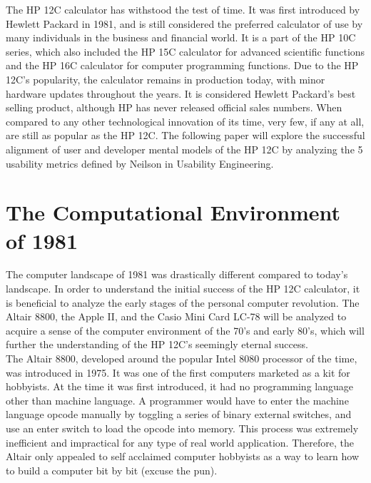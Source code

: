 \documentclass{article}
\begin{document}
The HP 12C calculator has withstood the test of time.  It was first introduced by Hewlett Packard in 1981, and is still considered the preferred calculator of use by many individuals in the business and financial world.   It is a part of the HP 10C series, which also included the HP 15C calculator for advanced scientific functions and the HP 16C calculator for computer programming functions.  Due to the HP 12C’s popularity, the calculator remains in production today, with minor hardware updates throughout the years.  It is considered Hewlett Packard’s best selling product, although HP has never released official sales numbers.  When compared to any other technological innovation of its time, very few, if any at all, are still as popular as the HP 12C.  The following paper will explore the successful alignment of user and developer mental models of the HP 12C by analyzing the 5 usability metrics defined by Neilson in Usability Engineering.

\section{The Computational Environment of 1981}
\label{The Computational Environment of 1981}

The computer landscape of 1981 was drastically different compared to today’s landscape.  In order to understand the initial success of the HP 12C calculator, it is beneficial to analyze the early stages of the personal computer revolution.  The Altair 8800, the Apple II, and the Casio Mini Card LC-78 will be analyzed to acquire a sense of the computer environment of the 70’s and early 80’s, which will further the understanding of the HP 12C’s seemingly eternal success.\\

The Altair 8800, developed around the popular Intel 8080 processor of the time, was introduced in 1975.  It was one of the first computers marketed as a kit for hobbyists.  At the time it was first introduced, it had no programming language other than machine language.  A programmer would have to enter the machine language opcode manually by toggling a series of binary external switches, and use an enter switch to load the opcode into memory.  This process was extremely inefficient and impractical for any type of real world application.  Therefore, the Altair only appealed to self acclaimed computer hobbyists as a way to learn how to build a computer bit by bit (excuse the pun).\\
\end{document}
